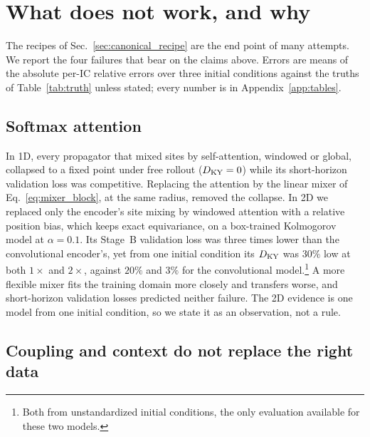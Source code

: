 \section{What does not work, and why}
\label{sec:failure}

The recipes of Sec.~\ref{sec:canonical_recipe} are the end point of many
attempts. We report the four failures that bear on the claims above.
Errors are means of the absolute per-IC relative errors over three
initial conditions against the truths of Table~\ref{tab:truth} unless
stated; every number is in Appendix~\ref{app:tables}.

\subsection{Softmax attention}
\label{sec:fail_attention}

In 1D, every propagator that mixed sites by self-attention, windowed or
global, collapsed to a fixed point under free rollout ($D_{\mathrm{KY}}=0$) while its
short-horizon validation loss was competitive. Replacing the attention
by the linear mixer of Eq.~\eqref{eq:mixer_block}, at the same radius,
removed the collapse. In 2D we replaced only the encoder's site mixing by
windowed attention with a relative position bias, which keeps exact
equivariance, on a box-trained Kolmogorov model at $\alpha=0.1$. Its
Stage~B validation loss was three times lower than the convolutional
encoder's, yet from one initial condition its $D_{\mathrm{KY}}$ was $30\%$ low at both
$1\times$ and $2\times$, against $20\%$ and $3\%$ for the convolutional
model.\footnote{Both from unstandardized initial conditions, the only
evaluation available for these two models.} A more flexible mixer fits
the training domain more closely and transfers worse, and short-horizon
validation losses predicted neither failure. The 2D evidence is one
model from one initial condition, so we state it as an observation, not
a rule.

\subsection{Coupling and context do not replace the right data}
\label{sec:fail_coupling}

